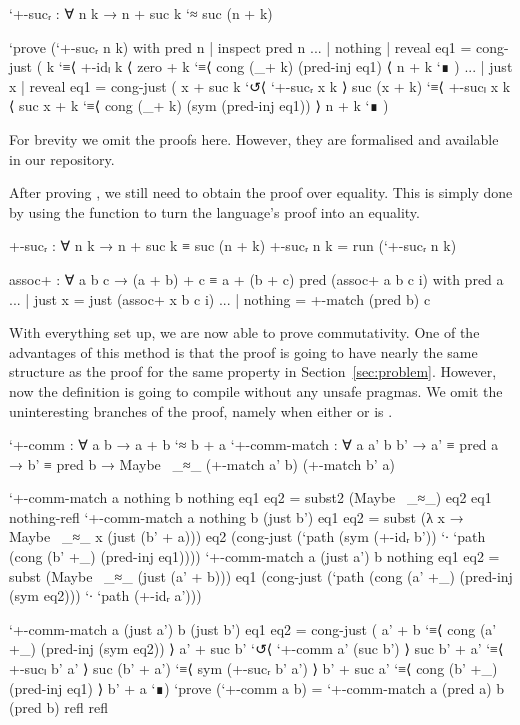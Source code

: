 \begin{code}
`+-sucᵣ : ∀ n k → n + suc k `≈ suc (n + k)
\end{code}
\begin{code}[hide]
`prove (`+-sucᵣ n k) with pred n | inspect pred n
... | nothing | reveal eq1 = cong-just (
  k
    `≡⟨ +-idₗ k ⟨
  zero + k
    `≡⟨ cong (_+ k) (pred-inj eq1) ⟨
  n + k `∎
  )
... | just x  | reveal eq1 = cong-just (
  x + suc k
    `↺⟨ `+-sucᵣ x k ⟩
  suc (x + k)
    `≡⟨ +-sucₗ x k ⟨
  suc x + k
    `≡⟨ cong (_+ k) (sym (pred-inj eq1)) ⟩
  n + k `∎
  )
\end{code}

For brevity we omit the proofs here. However, they are formalised and available in our repository.

After proving , we still need to obtain the proof over equality.
This is simply done by using the  function to turn the language's proof
into an equality.

\begin{code}
+-sucᵣ : ∀ n k → n + suc k ≡ suc (n + k)
+-sucᵣ n k = run (`+-sucᵣ n k)
\end{code}
\begin{code}[hide]
assoc+ : ∀ a b c → (a + b) + c ≡ a + (b + c)
pred (assoc+ a b c i) with pred a
... | just x = just (assoc+ x b c i)
... | nothing = +-match (pred b) c
\end{code}

With everything set up, we are now able to prove commutativity. One of the advantages
of this method is that the proof is going to have nearly the same structure as the proof
for the same property in Section~\ref{sec:problem}. However, now the definition is going to
compile without any unsafe pragmas. We omit the uninteresting branches of the proof, namely when either
 or  is .

\begin{code}
`+-comm : ∀ a b → a + b `≈ b + a
`+-comm-match :
  ∀ a a' b b' → a' ≡ pred a → b' ≡ pred b →
  Maybe~ _≈_ (+-match a' b) (+-match b' a)
\end{code}
\begin{code}[hide]
`+-comm-match a nothing b nothing eq1 eq2 = subst2 (Maybe~ _≈_) eq2 eq1 nothing-refl
`+-comm-match a nothing b (just b') eq1 eq2 = subst (λ x → Maybe~ _≈_ x (just (b' + a))) eq2 (cong-just (`path (sym (+-idᵣ b')) `∙ `path (cong (b' +_) (pred-inj eq1))))
`+-comm-match a (just a') b nothing eq1 eq2 = subst (Maybe~ _≈_ (just (a' + b))) eq1 (cong-just (`path (cong (a' +_) (pred-inj (sym eq2))) `∙ `path (+-idᵣ a')))
\end{code}
\begin{code}
`+-comm-match a (just a') b (just b') eq1 eq2 =
  cong-just
    ( a' + b         `≡⟨ cong (a' +_) (pred-inj (sym eq2)) ⟩
      a' + suc b'    `↺⟨ `+-comm a' (suc b') ⟩
      suc b' + a'    `≡⟨ +-sucₗ b' a' ⟩
      suc (b' + a')  `≡⟨ sym (+-sucᵣ b' a') ⟩
      b' + suc a'    `≡⟨ cong (b' +_) (pred-inj eq1) ⟩
      b' + a `∎)
`prove (`+-comm a b) =
  `+-comm-match a (pred a) b (pred b) refl refl
\end{code}

